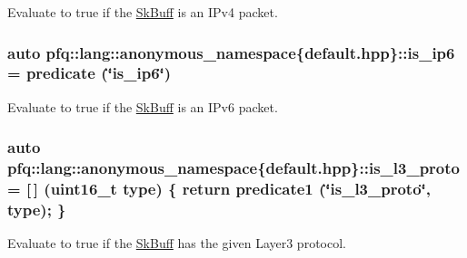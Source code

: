 Evaluate to {\ttfamily true} if the \hyperlink{structpfq_1_1lang_1_1SkBuff}{Sk\+Buff} is an I\+Pv4 packet. 

\hypertarget{namespacepfq_1_1lang_1_1anonymous__namespace_02default_8hpp_03_a5fa35e94e399b76838b7be894d85b83c}{
\subsubsection[{is\+\_\+ip6}]{\setlength{\rightskip}{0pt plus 5cm}auto pfq\+::lang\+::anonymous\+\_\+namespace\{default.\+hpp\}\+::is\+\_\+ip6 = {\bf predicate} (\char`\"{}is\+\_\+ip6\char`\"{})}}\label{namespacepfq_1_1lang_1_1anonymous__namespace_02default_8hpp_03_a5fa35e94e399b76838b7be894d85b83c}


Evaluate to {\ttfamily true} if the \hyperlink{structpfq_1_1lang_1_1SkBuff}{Sk\+Buff} is an I\+Pv6 packet. 

\hypertarget{namespacepfq_1_1lang_1_1anonymous__namespace_02default_8hpp_03_a814bb9c3c833dc2af342d695b1d503e8}{
\subsubsection[{is\+\_\+l3\+\_\+proto}]{\setlength{\rightskip}{0pt plus 5cm}auto pfq\+::lang\+::anonymous\+\_\+namespace\{default.\+hpp\}\+::is\+\_\+l3\+\_\+proto = \mbox{[}$\,$\mbox{]} (uint16\+\_\+t type) \{ return {\bf predicate1} (\char`\"{}is\+\_\+l3\+\_\+proto\char`\"{}, type); \}}}\label{namespacepfq_1_1lang_1_1anonymous__namespace_02default_8hpp_03_a814bb9c3c833dc2af342d695b1d503e8}


Evaluate to {\ttfamily true} if the \hyperlink{structpfq_1_1lang_1_1SkBuff}{Sk\+Buff} has the given Layer3 protocol. 

